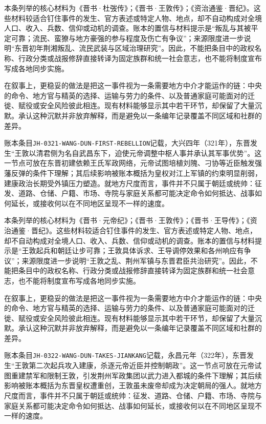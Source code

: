 本条列举的核心材料为《晋书·杜弢传》；《晋书·王敦传》；《资治通鉴·晋纪》。这些材料较适合钉住事件的发生、官方表述或特定人物、地点，却不自动构成对全境人口、收入、兵数、信仰或动机的调查。账本的置信与材料提示是“叛乱与其被平定可靠；流民、蛮獠与地方豪强的参与程度及伤亡有争议”；来源限度进一步说明“东晋初年荆湘叛乱、流民武装与区域治理研究”。因此，不能把条目中的政权名称、行政分类或战报修辞直接转译为固定族群和统一社会意志，也不能将制度宣布写成各地同步实施。

在叙事上，更稳妥的做法是把这一事件视为一条需要地方中介才能运作的链：中央的命令、地方官与精英的选择、运输与劳力的条件、以及普通家庭可能面对的迁徙、赋役或安全风险彼此相连。现有材料能够显示其中若干环节，却保留了大量沉默。承认这种沉默并非放弃解释，而是避免以一条编年记录覆盖不同区域和社群的差异。

账本条目\texttt{JH-0321-WANG-DUN-FIRST-REBELLION}记载，大兴四年（321年），东晋发生“王敦以清君侧为名自武昌东下，迫使元帝调整中枢人事并承认其军事优势”。这一节点可放在东晋初建依赖王氏军政网络，元帝试图培植刘隗、刁协等近臣触发强藩反弹的条件下理解；其后续影响被账本概括为皇权对江上军镇的约束明显削弱，建康政治长期受外镇压力塑造。就地方尺度而言，事件并不只属于朝廷或统帅：征发、道路、仓储、户籍、市场、寺院与家庭关系都可能决定命令如何抵达、战事如何延长，或接收何以在不同地区呈现不一样的速度。

本条列举的核心材料为《晋书·元帝纪》；《晋书·王敦传》；《晋书·王导传》；《资治通鉴·晋纪》。这些材料较适合钉住事件的发生、官方表述或特定人物、地点，却不自动构成对全境人口、收入、兵数、信仰或动机的调查。账本的置信与材料提示是“王敦起兵和朝廷让步可靠；王敦具体诉求、王导调停效果和各州响应有争议”；来源限度进一步说明“王敦之乱、荆州军镇与东晋君臣共治研究”。因此，不能把条目中的政权名称、行政分类或战报修辞直接转译为固定族群和统一社会意志，也不能将制度宣布写成各地同步实施。

在叙事上，更稳妥的做法是把这一事件视为一条需要地方中介才能运作的链：中央的命令、地方官与精英的选择、运输与劳力的条件、以及普通家庭可能面对的迁徙、赋役或安全风险彼此相连。现有材料能够显示其中若干环节，却保留了大量沉默。承认这种沉默并非放弃解释，而是避免以一条编年记录覆盖不同区域和社群的差异。

账本条目\texttt{JH-0322-WANG-DUN-TAKES-JIANKANG}记载，永昌元年（322年），东晋发生“王敦第二次起兵攻入建康，杀逐元帝近臣并控制朝政”。这一节点可放在元帝试图重建禁军和限制王敦，引发荆州军政集团以武力进入都城的条件下理解；其后续影响被账本概括为东晋皇权遭重创，王敦虽未废帝却成为决定朝局的强人。就地方尺度而言，事件并不只属于朝廷或统帅：征发、道路、仓储、户籍、市场、寺院与家庭关系都可能决定命令如何抵达、战事如何延长，或接收何以在不同地区呈现不一样的速度。

